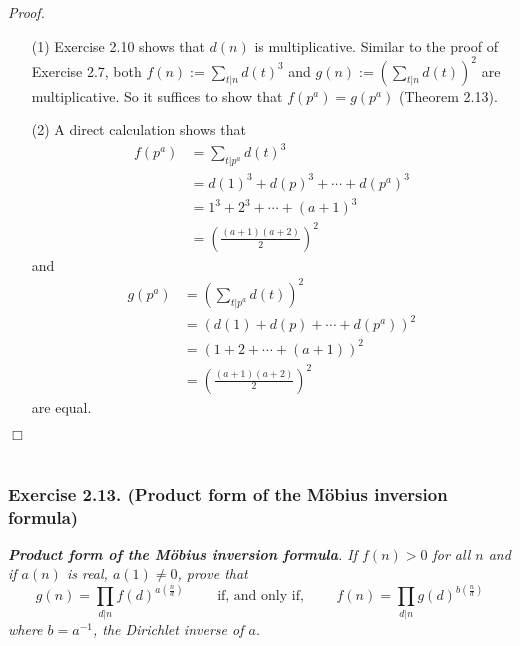 \documentclass{article}
\begin{document}
\emph{Proof.}
\begin{enumerate}
\item[(1)]
  Exercise 2.10 shows that $d(n)$ is multiplicative.
  Similar to the proof of Exercise 2.7,
  both $f(n) := \sum_{t|n} d(t)^3$ and $g(n) := \left(\sum_{t|n} d(t)\right)^2$
  are multiplicative.
  So it suffices to show that $f(p^a) = g(p^a)$ (Theorem 2.13).

\item[(2)]
  A direct calculation shows that
  \begin{align*}
    f(p^a)
    &= \sum_{t|p^a} d(t)^3 \\
    &= d(1)^3 + d(p)^3 + \cdots + d(p^a)^3 \\
    &= 1^3 + 2^3 + \cdots + (a+1)^3 \\
    &= \left( \frac{(a+1)(a+2)}{2} \right)^2
  \end{align*}
  and
  \begin{align*}
    g(p^a)
    &= \left( \sum_{t|p^a} d(t) \right)^2 \\
    &= (d(1) + d(p) + \cdots + d(p^a))^2 \\
    &= (1 + 2 + \cdots + (a+1))^2 \\
    &= \left( \frac{(a+1)(a+2)}{2} \right)^2
  \end{align*}
  are equal.
\end{enumerate}
$\Box$ \\\\






\subsubsection*{Exercise 2.13. (Product form of the M\"obius inversion formula)}
\emph{\textbf{Product form of the M\"obius inversion formula}.
If $f(n) > 0$ for all $n$ and if $a(n)$ is real, $a(1) \neq 0$,
prove that
\[
  g(n) = \prod_{d|n} f(d)^{a\left(\frac{n}{d}\right)}
  \qquad
  \text{ if, and only if, }
  \qquad
  f(n) = \prod_{d|n} g(d)^{b\left(\frac{n}{d}\right)}
\]
where $b = a^{-1}$, the Dirichlet inverse of $a$.} \\
\end{document}
